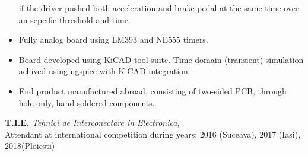 \documentclass{resume}
\begin{document}
\begin{resume}
\begin{itemize}
        if the driver pushed both acceleration and brake pedal at the same time over an sepcific threshold and time.
        \item Fully analog board using LM393 and NE555 timers.
        \item Board developed using KiCAD tool suite. 
        Time domain (transient) simulation achived using ngspice with KiCAD integration.
        \item End product manufactured abroad, consisting of two-sided PCB, 
        through hole only, hand-soldered components.
    \end{itemize}
    {\bf T.I.E.} {\it Tehnici de Interconectare in Electronica, }\\
    Attendant at international competition during years:
    2016 (Suceava), 2017 (Iasi), 2018(Ploiesti)

\end{resume}
\end{document}
